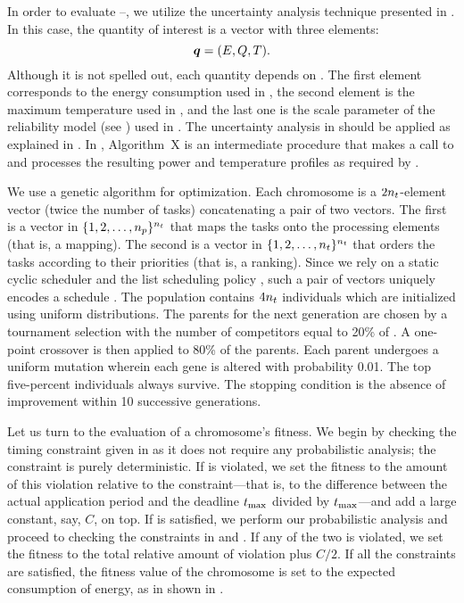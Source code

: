 In order to evaluate --, we utilize
the uncertainty analysis technique presented in . In
this case, the quantity of interest is a vector with three elements:
\[
  \boldsymbol{q} = (E, Q, T).
\]
Although it is not spelled out, each quantity depends on \schedule. The first
element corresponds to the energy consumption used in , the
second element is the maximum temperature used in , and
the last one is the scale parameter of the reliability model (see
) used in . The
uncertainty analysis in  should be applied as
explained in . In ,
Algorithm~X is an intermediate procedure that makes a call to
 and processes the resulting power and temperature
profiles as required by .

We use a genetic algorithm for optimization. Each chromosome is a $2
{n_{t}}$-element vector (twice the number of tasks) concatenating a pair of two
vectors. The first is a vector in $\{ 1, 2, \dotsc, {n_{p}}\}^{n_{t}}$ that maps the
tasks onto the processing elements (that is, a mapping). The second is a vector
in $\{ 1, 2, \dotsc, {n_{t}} \}^{n_{t}}$ that orders the tasks according to their
priorities (that is, a ranking). Since we rely on a static cyclic scheduler and
the list scheduling policy \cite{adam1974}, such a pair of vectors uniquely
encodes a schedule \schedule. The population contains $4 {n_{t}}$ individuals which
are initialized using uniform distributions. The parents for the next generation
are chosen by a tournament selection with the number of competitors equal to
20\% of \nt. A one-point crossover is then applied to 80\% of the parents. Each
parent undergoes a uniform mutation wherein each gene is altered with
probability 0.01. The top five-percent individuals always survive. The stopping
condition is the absence of improvement within 10 successive generations.

Let us turn to the evaluation of a chromosome's fitness. We begin by checking
the timing constraint given in  as it does not require
any probabilistic analysis; the constraint is purely deterministic. If
 is violated, we set the fitness to the amount of this
violation relative to the constraint---that is, to the difference between the
actual application period and the deadline $t_{\mathrm{max}}$ divided by
$t_{\mathrm{max}}$---and add a large constant, say, $C$, on top. If
 is satisfied, we perform our probabilistic analysis and
proceed to checking the constraints in  and
. If any of the two is violated, we set the fitness
to the total relative amount of violation plus $C / 2$. If all the constraints
are satisfied, the fitness value of the chromosome is set to the expected
consumption of energy, as in shown in .

